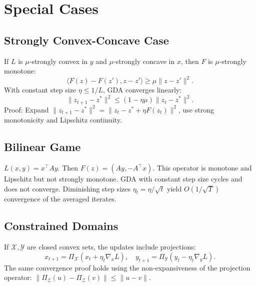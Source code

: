 \documentclass{article}
\begin{document}
\section*{Special Cases}

\subsection*{Strongly Convex-Concave Case}
If $L$ is $\mu$-strongly convex in $y$ and $\mu$-strongly concave in $x$, then $F$ is $\mu$-strongly monotone:
\[
\langle F(z) - F(z'), z - z' \rangle \ge \mu \|z - z'\|^2.
\]
With constant step size $\eta \le 1/L$, GDA converges linearly:
\[
\|z_{t+1} - z^*\|^2 \le (1 - \eta \mu) \|z_t - z^*\|^2.
\]
Proof: Expand $\|z_{t+1} - z^*\|^2 = \|z_t - z^* + \eta F(z_t)\|^2$, use strong monotonicity and Lipschitz continuity.

\subsection*{Bilinear Game}
$L(x,y) = x^\top A y$. Then $F(z) = (A y, -A^\top x)$. This operator is monotone and Lipschitz but not strongly monotone. GDA with constant step size cycles and does not converge. Diminishing step sizes $\eta_t = \eta/\sqrt{t}$ yield $O(1/\sqrt{T})$ convergence of the averaged iterates.

\subsection*{Constrained Domains}
If $\mathcal{X}, \mathcal{Y}$ are closed convex sets, the updates include projections:
\[
x_{t+1} = \Pi_{\mathcal{X}}(x_t + \eta_t \nabla_x L), \quad y_{t+1} = \Pi_{\mathcal{Y}}(y_t - \eta_t \nabla_y L).
\]
The same convergence proof holds using the non-expansiveness of the projection operator: $\|\Pi_{\mathcal{Z}}(u) - \Pi_{\mathcal{Z}}(v)\| \le \|u - v\|$.
\end{document}
